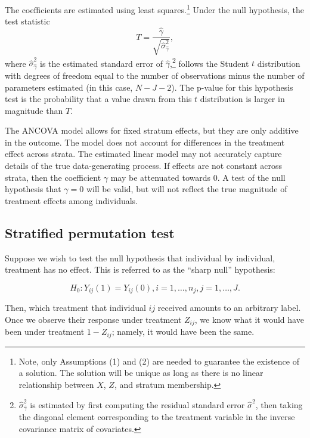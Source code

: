 \documentclass[11pt]{article}
\newcommand{\todo}[1]{{\color{red}{TO DO: \sc #1}}}
\begin{document}
The coefficients are estimated using least squares.\footnote{
Note, only Assumptions (1) and (2) are needed to guarantee the existence of a solution.
The solution will be unique as long as there is no linear relationship between $X$, $Z$, and stratum membership.
}
Under the null hypothesis, the test statistic 
$$ T = \frac{\hat{\gamma}}{\sqrt{ \hat{\sigma}_{\hat{\gamma}}^2}},$$
where $\hat{\sigma}_{\hat{\gamma}}^2$ is the estimated standard error of $\hat{\gamma}$,\footnote{
$\hat{\sigma}_{\hat{\gamma}}^2$ is estimated by first computing the residual standard error $\hat{\sigma}^2$,
then taking the diagonal element corresponding to the treatment variable in the inverse covariance matrix of covariates.
}
follows the Student $t$ distribution with degrees of freedom equal to the number of observations minus the number of parameters estimated (in this case, $N - J - 2$).
The p-value for this hypothesis test is the probability that a value drawn from this $t$ distribution is larger in magnitude than $T$.

\todo{Add a paragraph about why this might go wrong, perhaps some citations. All depends on estimating the error variance correctly, because $t$ distribution is the ratio of a normal and a chi-square}


The ANCOVA model allows for fixed stratum effects, but they are only additive in the outcome.  
The model does not account for differences in the treatment effect across strata.  
The estimated linear model may not accurately capture details of the true data-generating process.  
If effects are not constant across strata, then the coefficient $\gamma$ may be attenuated towards 0.  
A test of the null hypothesis that $\gamma = 0$ will be valid, but will not reflect the true magnitude of treatment effects among individuals.

\subsection{Stratified permutation test}
Suppose we wish to test the null hypothesis that individual by individual, treatment has no effect.
This is referred to as the ``sharp null'' hypothesis:

$$H_0: Y_{ij}(1) = Y_{ij}(0), i = 1, \dots, n_j, j = 1,\dots, J.$$

Then, which treatment that individual $ij$ received amounts to an arbitrary label.
Once we observe their response under treatment $Z_{ij}$, we know what it would have been under treatment $1-Z_{ij}$; namely, it would have been the same.
\end{document}
